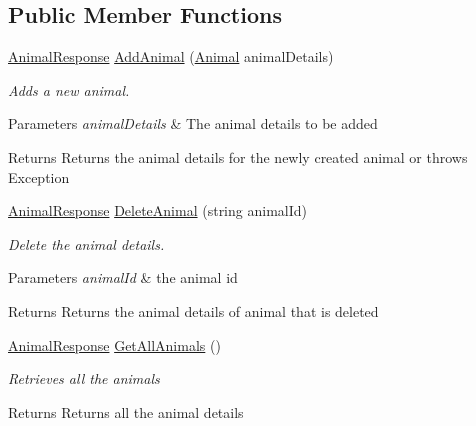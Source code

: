 \subsection*{Public Member Functions}
\begin{DoxyCompactItemize}
\item 
\hyperlink{classWildLifeTracker_1_1Response_1_1AnimalResponse}{Animal\+Response} \hyperlink{interfaceWildLifeTracker_1_1Services_1_1IAnimalService_ae578d708ed9407d8805d69b193eff67b}{Add\+Animal} (\hyperlink{classWildLifeTracker_1_1Models_1_1Animal}{Animal} animal\+Details)
\begin{DoxyCompactList}\small\item\em Adds a new animal. 
\begin{DoxyParams}{Parameters}
{\em animal\+Details} & The animal details to be added\\
\hline
\end{DoxyParams}
\begin{DoxyReturn}{Returns}
Returns the animal details for the newly created animal or throws Exception
\end{DoxyReturn}
\end{DoxyCompactList}\item 
\hyperlink{classWildLifeTracker_1_1Response_1_1AnimalResponse}{Animal\+Response} \hyperlink{interfaceWildLifeTracker_1_1Services_1_1IAnimalService_a201e384747e50bd19c431955eae072fa}{Delete\+Animal} (string animal\+Id)
\begin{DoxyCompactList}\small\item\em Delete the animal details. 
\begin{DoxyParams}{Parameters}
{\em animal\+Id} & the animal id\\
\hline
\end{DoxyParams}
\begin{DoxyReturn}{Returns}
Returns the animal details of animal that is deleted
\end{DoxyReturn}
\end{DoxyCompactList}\item 
\hyperlink{classWildLifeTracker_1_1Response_1_1AnimalResponse}{Animal\+Response} \hyperlink{interfaceWildLifeTracker_1_1Services_1_1IAnimalService_a38b8ef318dc92ac93cfcbbc33a454c5a}{Get\+All\+Animals} ()
\begin{DoxyCompactList}\small\item\em Retrieves all the animals \begin{DoxyReturn}{Returns}
Returns all the animal details
\end{DoxyReturn}

\end{DoxyCompactList}
\end{DoxyCompactItemize}

